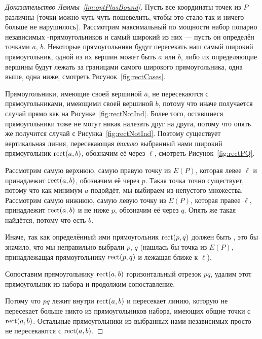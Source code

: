 \begin{proof}[Доказательство Леммы~\ref{lm:optPlusBound}]
Пусть все координаты точек из $P$ различны (точки можно чуть-чуть пошевелить, чтобы это стало так и ничего больше не нарушилось). Рассмотрим максимальный по мощности набор попарно независимых \tpl-прямоугольников и самый широкий из них — пусть он определён точками $a$, $b$. Некоторые прямоугольники будут пересекать наш самый широкий прямоугольник, одной из их вершин может быть $a$ или $b$, либо их определяющие вершины будут лежать за границами самого широкого прямоугольника, одна выше, одна ниже, смотреть Рисунок~\ref{fig:rectCases}.



Прямоугольники, имеющие своей вершиной $a$, не пересекаются с прямоугольниками, имеющими своей вершиной $b$, потому что иначе получается случай прямо как на Рисунке~\ref{fig:rectNotInd}. Более того, оставшиеся прямоугольники тоже не могут никак налезать друг на друга, потому что опять же получится случай с Рисунка~\ref{fig:rectNotInd}. Поэтому существует вертикальная линия, пересекающая {\it только} выбранный нами широкий прямоугольник $\operatorname{rect} (a,b)$, обозначим её через $\ell$, смотреть Рисунок~\ref{fig:rectPQ}.

Рассмотрим самую верхнюю, самую правую точку из $E(P)$, которая левее $\ell$ и принадлежит $\operatorname{rect} (a,b)$, обозначим её через $p$. Такая точка точно существует, потому что как минимум $a$ подойдёт, мы выбираем из непустого множества. Рассмотрим самую нижнюю, самую левую точку из $E(P)$, которая правее $\ell$, принадлежит $\operatorname{rect} (a,b)$ и не ниже $p$, обозначим её через $q$. Опять же такая найдётся, потому что есть $b$.


Иначе, так как определённый ими прямоугольник $\operatorname{rect} (p,q)$ должен быть \arbs, это бы значило, что мы неправильно выбрали $p$, $q$ (нашлась бы точка из $E(P)$, принадлежащая прямоугольнику $\operatorname{rect} (p,q)$ и лежащая ближе к $\ell$).

Сопоставим прямоугольнику $\operatorname{rect} (a,b)$ горизонтальный отрезок $pq$, удалим этот прямоугольник из набора и продолжим сопоставление.


Потому что $pq$ лежит внутри $\operatorname{rect}(a,b)$ и пересекает линию, которую не пересекает больше никто из прямоугольников набора, имеющих общие точки с $\operatorname{rect}(a,b)$. Остальные прямоугольники из выбранных нами независимых просто не пересекаются с $\operatorname{rect}(a,b)$.


\end{proof}
